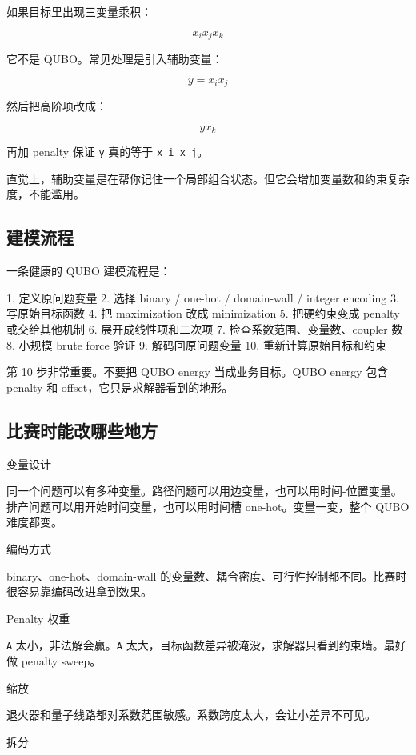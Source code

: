 \documentclass[UTF8,12pt,a4paper]{ctexart}
\begin{document}
如果目标里出现三变量乘积：

\[
x_{i} x_{j} x_{k}
\]

它不是 QUBO。常见处理是引入辅助变量：

\[
y = x_{i} x_{j}
\]

然后把高阶项改成：

\[
y x_{k}
\]

再加 penalty 保证 \texttt{y} 真的等于 \texttt{x\_i x\_j}。

直觉上，辅助变量是在帮你记住一个局部组合状态。但它会增加变量数和约束复杂度，不能滥用。

\subsection*{建模流程}

一条健康的 QUBO 建模流程是：

\begin{GuideVerbatim}
1. 定义原问题变量
2. 选择 binary / one-hot / domain-wall / integer encoding
3. 写原始目标函数
4. 把 maximization 改成 minimization
5. 把硬约束变成 penalty 或交给其他机制
6. 展开成线性项和二次项
7. 检查系数范围、变量数、coupler 数
8. 小规模 brute force 验证
9. 解码回原问题变量
10. 重新计算原始目标和约束
\end{GuideVerbatim}

第 10 步非常重要。不要把 QUBO energy 当成业务目标。QUBO energy 包含 penalty 和 offset，它只是求解器看到的地形。

\subsection*{比赛时能改哪些地方}

变量设计

同一个问题可以有多种变量。路径问题可以用边变量，也可以用时间-位置变量。排产问题可以用开始时间变量，也可以用时间槽 one-hot。变量一变，整个 QUBO 难度都变。

编码方式

binary、one-hot、domain-wall 的变量数、耦合密度、可行性控制都不同。比赛时很容易靠编码改进拿到效果。

Penalty 权重

\texttt{A} 太小，非法解会赢。\texttt{A} 太大，目标函数差异被淹没，求解器只看到约束墙。最好做 penalty sweep。

缩放

退火器和量子线路都对系数范围敏感。系数跨度太大，会让小差异不可见。

拆分
\end{document}

